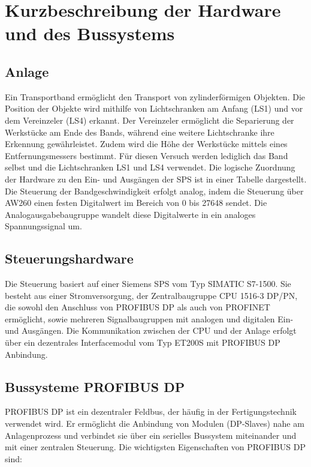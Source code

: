 \documentclass{report}
\begin{document}
\section{Kurzbeschreibung der Hardware und des Bussystems}

\subsection{Anlage}

Ein Transportband ermöglicht den Transport von zylinderförmigen Objekten. Die Position der Objekte wird mithilfe von Lichtschranken am Anfang (LS1) und vor dem Vereinzeler (LS4) erkannt. Der Vereinzeler ermöglicht die Separierung der Werkstücke am Ende des Bands, während eine weitere Lichtschranke ihre Erkennung gewährleistet. Zudem wird die Höhe der Werkstücke mittels eines Entfernungsmessers bestimmt. Für diesen Versuch werden lediglich das Band selbst und die Lichtschranken LS1 und LS4 verwendet. Die logische Zuordnung der Hardware zu den Ein- und Ausgängen der SPS ist in einer Tabelle dargestellt. Die Steuerung der Bandgeschwindigkeit erfolgt analog, indem die Steuerung über AW260 einen festen Digitalwert im Bereich von 0 bis 27648 sendet. Die Analogausgabebaugruppe wandelt diese Digitalwerte in ein analoges Spannungssignal um.

\subsection{Steuerungshardware}

Die Steuerung basiert auf einer Siemens SPS vom Typ SIMATIC S7-1500. Sie besteht aus einer Stromversorgung, der Zentralbaugruppe CPU 1516-3 DP/PN, die sowohl den Anschluss von PROFIBUS DP als auch von PROFINET ermöglicht, sowie mehreren Signalbaugruppen mit analogen und digitalen Ein- und Ausgängen. Die Kommunikation zwischen der CPU und der Anlage erfolgt über ein dezentrales Interfacemodul vom Typ ET200S mit PROFIBUS DP Anbindung.

\subsection{Bussysteme PROFIBUS DP}

PROFIBUS DP ist ein dezentraler Feldbus, der häufig in der Fertigungstechnik verwendet wird. Er ermöglicht die Anbindung von Modulen (DP-Slaves) nahe am Anlagenprozess und verbindet sie über ein serielles Bussystem miteinander und mit einer zentralen Steuerung. Die wichtigsten Eigenschaften von PROFIBUS DP sind:
\end{document}
